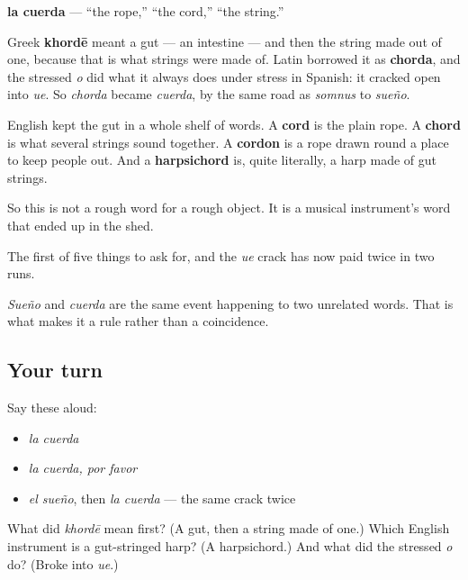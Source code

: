 \begin{cousinweb}
\textbf{la cuerda} — \textquotedblleft{}the rope,\textquotedblright{} \textquotedblleft{}the cord,\textquotedblright{} \textquotedblleft{}the string.\textquotedblright{}

Greek \textbf{khordē} meant a gut — an intestine — and then the string made out of one, because that is what strings were made of. Latin borrowed it as \textbf{chorda}, and the stressed \emph{o} did what it always does under stress in Spanish: it cracked open into \emph{ue}. So \emph{chorda} became \emph{cuerda}, by the same road as \emph{somnus} to \emph{sueño}.

English kept the gut in a whole shelf of words. A \textbf{cord} is the plain rope. A \textbf{chord} is what several strings sound together. A \textbf{cordon} is a rope drawn round a place to keep people out. And a \textbf{harpsichord} is, quite literally, a harp made of gut strings.

So this is not a rough word for a rough object. It is a musical instrument's word that ended up in the shed.
\end{cousinweb}

\begin{grammarlens}[title={What you've built}]
The first of five things to ask for, and the \emph{ue} crack has now paid twice in two runs.

\emph{Sueño} and \emph{cuerda} are the same event happening to two unrelated words. That is what makes it a rule rather than a coincidence.
\end{grammarlens}

\subsection*{Your turn}
Say these aloud:

\begin{itemize}
\raggedright
  \item \emph{la cuerda}
  \item \emph{la cuerda, por favor}
  \item \emph{el sueño}, then \emph{la cuerda} — the same crack twice
\end{itemize}

\begin{tcolorbox}[breakable,colback=teal!4,colframe=teal!35!black,title={Before you move on}]
What did \emph{khordē} mean first? (A gut, then a string made of one.) Which English instrument is a gut-stringed harp? (A harpsichord.) And what did the stressed \emph{o} do? (Broke into \emph{ue}.)
\end{tcolorbox}

